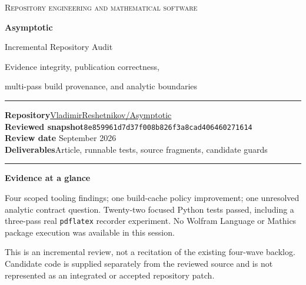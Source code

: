 \documentclass[11pt,letterpaper]{article}
\newcommand{\code}[1]{\nolinkurl{#1}}
\newcommand{\pin}{\texttt{8e859961d7d37f008b826f3a8cad406460271614}}
\newcommand{\repo}{https://github.com/VladimirReshetnikov/Asymptotic}
\begin{document}
\begin{titlepage}
\vspace*{0.65in}
{\large\scshape Repository engineering and mathematical software\par}
\vspace{0.4in}
{\Huge\bfseries Asymptotic\par}
\vspace{0.16in}
{\LARGE Incremental Repository Audit\par}
\vspace{0.3in}
{\Large Evidence integrity, publication correctness,\par
multi-pass build provenance, and analytic boundaries\par}
\vspace{0.55in}
\par\rule{\textwidth}{0.7pt}\par
\vspace{0.18in}
\textbf{Repository}\quad \href{\repo}{VladimirReshetnikov/Asymptotic}\\[7pt]
\textbf{Reviewed snapshot}\quad \pin\\[7pt]
\textbf{Review date} September 2026\\[7pt]
\textbf{Deliverables}\quad Article, runnable tests, source fragments, candidate guards\par
\vspace{0.3in}
\par\rule{\textwidth}{0.7pt}\par
\vfill
\textbf{Evidence at a glance}

Four scoped tooling findings; one build-cache policy improvement; one unresolved
analytic contract question. Twenty-two focused Python tests passed, including a
three-pass real \code{pdflatex} recorder experiment. No Wolfram Language or Mathics
package execution was available in this session.

\vspace{0.15in}
\small This is an incremental review, not a recitation of the existing four-wave
backlog. Candidate code is supplied separately from the reviewed source and is
not represented as an integrated or accepted repository patch.
\end{titlepage}
\end{document}
